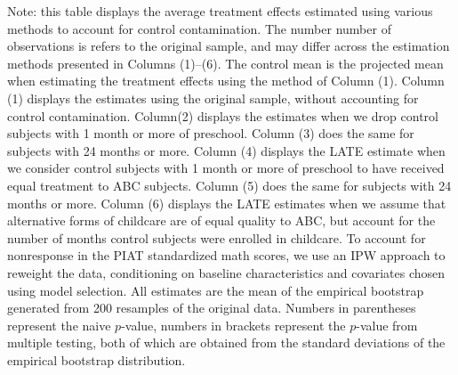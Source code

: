 \begin{table}[H]
\begin{threeparttable}
\begin{tabular}{cccccccccc}
  \hline\hline
  \end{tabular}
    \begin{tablenotes}
    \scriptsize
    \item 
Note: this table displays the average treatment effects estimated using various methods to
account for control contamination. The number number of observations is refers to the 
original sample, and may differ across the estimation methods presented in Columns (1)--(6). 
The control mean is the projected mean when estimating the treatment 
effects using the method of Column (1). Column (1) displays the estimates using the original
sample, without accounting for control contamination. 
Column(2) displays the estimates when we drop control subjects with 1 month or more of preschool.
Column (3) does the same for subjects with 24 months or more. Column (4) displays the LATE
estimate when we consider control subjects with 1 month or more of preschool to have received
equal treatment to ABC subjects. Column (5) does the same for subjects with 24 months or more.
Column (6) displays the LATE estimates when we assume that alternative forms of childcare
are of equal quality to ABC, but account for the number of months control subjects were
enrolled in childcare. To account for nonresponse in the PIAT standardized math scores, we use an IPW approach to reweight the data,
conditioning on baseline characteristics and covariates chosen using model selection. 
All estimates are the mean of the empirical bootstrap generated 
from 200 resamples of the original data. Numbers in parentheses represent the naive $p$-value,
numbers in brackets represent the $p$-value from multiple testing, both of which are obtained from 
the standard deviations of the empirical bootstrap distribution.

    \end{tablenotes}
  \end{threeparttable}

\end{table}